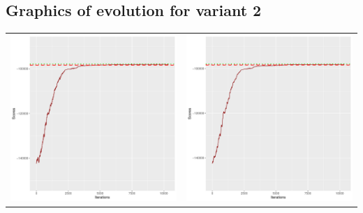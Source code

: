 \documentclass[]{scrartcl}
\begin{document}
\clearpage

\subsection{Graphics of evolution for variant 2}

\begin{table}[h!]
\begin{tabular}{cc}
\includegraphics[scale = 0.4]{./figs/hepar2/v2/25/boundsEvolution-10352.pdf} & 
\includegraphics[scale = 0.4]{./figs/hepar2/v2/50/boundsEvolution-10352.pdf} \\

\end{tabular}
\end{table}
\end{document}
